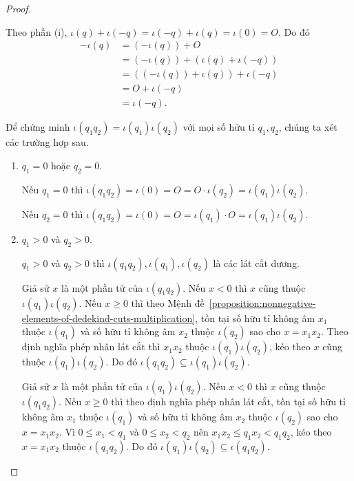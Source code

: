 \begin{proof}
\begin{enumerate}[label={(\roman*)}]
              Theo phần (i), $\iota(q) + \iota(-q) = \iota(-q) + \iota(q) = \iota(0) = O$. Do đó
              \begin{align*}
                  -\iota(q) & = (-\iota(q)) + O                      \\
                            & = (-\iota(q)) + (\iota(q) + \iota(-q)) \\
                            & = ((-\iota(q)) + \iota(q)) + \iota(-q) \\
                            & = O + \iota(-q)                        \\
                            & = \iota(-q).
              \end{align*}

              Để chứng minh $\iota(q_{1}q_{2}) = \iota(q_{1})\iota(q_{2})$ với mọi số hữu tỉ $q_{1}, q_{2}$, chúng ta xét các trường hợp sau.
              \begin{enumerate}[label={\textbf{Trường hợp \arabic*.}},itemindent=2cm]
                  \item $q_{1} = 0$ hoặc $q_{2} = 0$.

                        Nếu $q_{1} = 0$ thì $\iota(q_{1}q_{2}) = \iota(0) = O = O\cdot\iota(q_{2}) = \iota(q_{1})\iota(q_{2})$.

                        Nếu $q_{2} = 0$ thì $\iota(q_{1}q_{2}) = \iota(0) = O = \iota(q_{1})\cdot O = \iota(q_{1})\iota(q_{2})$.
                  \item $q_{1} > 0$ và $q_{2} > 0$.

                        $q_{1} > 0$ và $q_{2} > 0$ thì $\iota(q_{1}q_{2}), \iota(q_{1}), \iota(q_{2})$ là các lát cắt dương.

                        Giả sử $x$ là một phần tử của $\iota(q_{1}q_{2})$. Nếu $x < 0$ thì $x$ cũng thuộc $\iota(q_{1})\iota(q_{2})$. Nếu $x\geq 0$ thì theo Mệnh đề~\ref{proposition:nonnegative-elements-of-dedekind-cuts-multiplication}, tồn tại số hữu tỉ không âm $x_{1}$ thuộc $\iota(q_{1})$ và số hữu tỉ không âm $x_{2}$ thuộc $\iota(q_{2})$ sao cho $x = x_{1}x_{2}$. Theo định nghĩa phép nhân lát cắt thì $x_{1}x_{2}$ thuộc $\iota(q_{1})\iota(q_{2})$, kéo theo $x$ cũng thuộc $\iota(q_{1})\iota(q_{2})$. Do đó $\iota(q_{1}q_{2}) \subseteq \iota(q_{1})\iota(q_{2})$.

                        Giả sử $x$ là một phần tử của $\iota(q_{1})\iota(q_{2})$. Nếu $x < 0$ thì $x$ cũng thuộc $\iota(q_{1}q_{2})$. Nếu $x\geq 0$ thì theo định nghĩa phép nhân lát cắt, tồn tại số hữu tỉ không âm $x_{1}$ thuộc $\iota(q_{1})$ và số hữu tỉ không âm $x_{2}$ thuộc $\iota(q_{2})$ sao cho $x = x_{1}x_{2}$. Vì $0\leq x_{1} < q_{1}$ và $0\leq x_{2} < q_{2}$ nên $x_{1}x_{2}\leq q_{1}x_{2} < q_{1}q_{2}$, kéo theo $x = x_{1}x_{2}$ thuộc $\iota(q_{1}q_{2})$. Do đó $\iota(q_{1})\iota(q_{2}) \subseteq \iota(q_{1}q_{2})$.


\end{enumerate}
\end{enumerate}
\end{proof}
